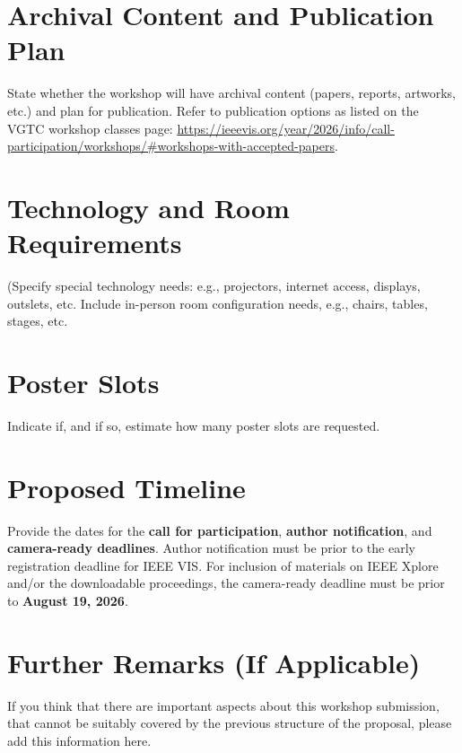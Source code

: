 \documentclass{vgtc}                          %
\begin{document}
\section{Archival Content and Publication Plan}

State whether the workshop will have archival content (papers, reports, artworks, etc.) and plan for publication. 
Refer to publication options as listed on the VGTC workshop classes page: \url{https://ieeevis.org/year/2026/info/call-participation/workshops/#workshops-with-accepted-papers}.

\section{Technology and Room Requirements}

(Specify special technology needs: e.g., projectors, internet access, displays, outslets, etc. 
Include in-person room configuration needs, e.g., chairs, tables, stages, etc.

\section{Poster Slots}

Indicate if, and if so, estimate how many poster slots are requested.

\section{Proposed Timeline}

Provide the dates for the \textbf{call for participation}, \textbf{author notification}, and \textbf{camera-ready deadlines}.
Author notification must be prior to the early registration deadline for IEEE VIS.
For inclusion of materials on IEEE Xplore and/or the downloadable proceedings, the camera-ready deadline must be prior to \textbf{August 19, 2026}.

\section{Further Remarks (If Applicable)}

If you think that there are important aspects about this workshop submission, that cannot be suitably covered by the previous structure of the proposal, please add this information here.





%

%
%
%


\end{document}
